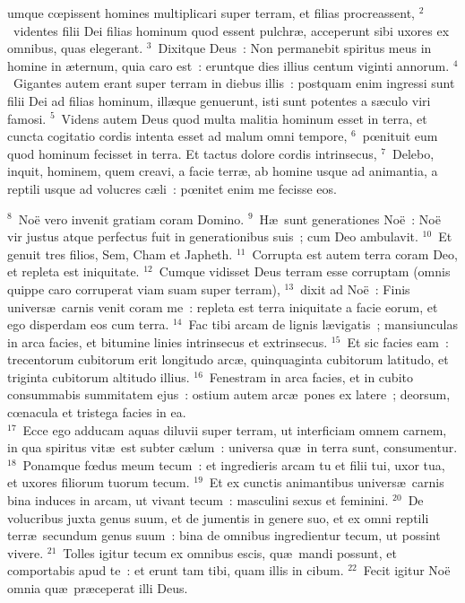 \bchapter
{}umque cœpissent homines multiplicari super terram, et filias procreassent,
${}^{2}$~videntes filii Dei filias hominum quod essent pulchr\ae , acceperunt sibi uxores ex omnibus, quas elegerant.
${}^{3}$~Dixitque Deus~: Non permanebit spiritus meus in homine in \ae ternum, quia caro est~: eruntque dies illius centum viginti annorum.
${}^{4}$~Gigantes autem erant super terram in diebus illis~: postquam enim ingressi sunt filii Dei ad filias hominum, ill\ae que genuerunt, isti sunt potentes a s\ae culo viri famosi.
${}^{5}$~Videns autem Deus quod multa malitia hominum esset in terra, et cuncta cogitatio cordis intenta esset ad malum omni tempore,
${}^{6}$~pœnituit eum quod hominum fecisset in terra. Et tactus dolore cordis intrinsecus,
${}^{7}$~Delebo, inquit, hominem, quem creavi, a facie terr\ae , ab homine usque ad animantia, a reptili usque ad volucres c\ae li~: pœnitet enim me fecisse eos.


${}^{8}$~No\"e vero invenit gratiam coram Domino.
${}^{9}$~H\ae\ sunt generationes No\"e~: No\"e vir justus atque perfectus fuit in generationibus suis~; cum Deo ambulavit.
${}^{10}$~Et genuit tres filios, Sem, Cham et Japheth.
${}^{11}$~Corrupta est autem terra coram Deo, et repleta est iniquitate.
${}^{12}$~Cumque vidisset Deus terram esse corruptam (omnis quippe caro corruperat viam suam super terram),
${}^{13}$~dixit ad No\"e~: Finis univers\ae\ carnis venit coram me~: repleta est terra iniquitate a facie eorum, et ego disperdam eos cum terra.
${}^{14}$~Fac tibi arcam de lignis l\ae vigatis~; mansiunculas in arca facies, et bitumine linies intrinsecus et extrinsecus.
${}^{15}$~Et sic facies eam~: trecentorum cubitorum erit longitudo arc\ae , quinquaginta cubitorum latitudo, et triginta cubitorum altitudo illius.
${}^{16}$~Fenestram in arca facies, et in cubito consummabis summitatem ejus~: ostium autem arc\ae\ pones ex latere~; deorsum, cœnacula et tristega facies in ea.\\
${}^{17}$~Ecce ego adducam aquas diluvii super terram, ut interficiam omnem carnem, in qua spiritus vit\ae\ est subter c\ae lum~: universa qu\ae\ in terra sunt, consumentur.
${}^{18}$~Ponamque fœdus meum tecum~: et ingredieris arcam tu et filii tui, uxor tua, et uxores filiorum tuorum tecum.
${}^{19}$~Et ex cunctis animantibus univers\ae\ carnis bina induces in arcam, ut vivant tecum~: masculini sexus et feminini.
${}^{20}$~De volucribus juxta genus suum, et de jumentis in genere suo, et ex omni reptili terr\ae\ secundum genus suum~: bina de omnibus ingredientur tecum, ut possint vivere.
${}^{21}$~Tolles igitur tecum ex omnibus escis, qu\ae\ mandi possunt, et comportabis apud te~: et erunt tam tibi, quam illis in cibum.
${}^{22}$~Fecit igitur No\"e omnia qu\ae\ pr\ae ceperat illi Deus.

